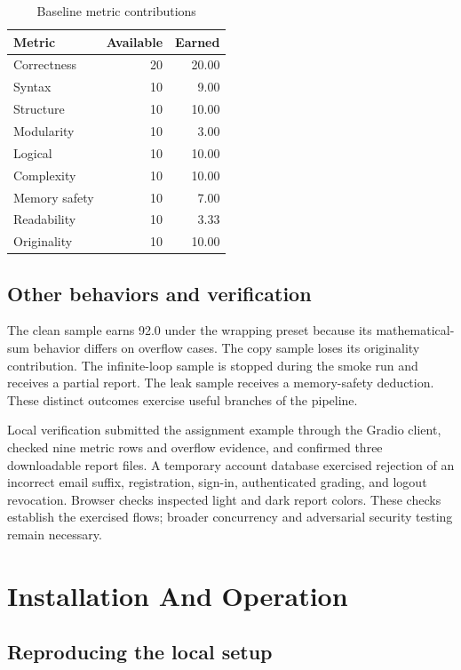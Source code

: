 \documentclass[conference]{IEEEtran}
\begin{document}
\begin{table}[H]\caption{Baseline metric contributions}\label{tab:2}\centering\begin{tabular}{lrr}\hline
Metric & Available & Earned \\\hline
Correctness & 20 & 20.00 \\
Syntax & 10 & 9.00 \\
Structure & 10 & 10.00 \\
Modularity & 10 & 3.00 \\
Logical & 10 & 10.00 \\
Complexity & 10 & 10.00 \\
Memory safety & 10 & 7.00 \\
Readability & 10 & 3.33 \\
Originality & 10 & 10.00 \\\hline\end{tabular}\end{table}

\subsection{Other behaviors and verification}

The clean sample earns 92.0 under the wrapping preset because its mathematical-sum behavior differs on overflow cases. The copy sample loses its originality contribution. The infinite-loop sample is stopped during the smoke run and receives a partial report. The leak sample receives a memory-safety deduction. These distinct outcomes exercise useful branches of the pipeline.


Local verification submitted the assignment example through the Gradio client, checked nine metric rows and overflow evidence, and confirmed three downloadable report files. A temporary account database exercised rejection of an incorrect email suffix, registration, sign-in, authenticated grading, and logout revocation. Browser checks inspected light and dark report colors. These checks establish the exercised flows; broader concurrency and adversarial security testing remain necessary.


\newpage

\section{Installation And Operation}

\subsection{Reproducing the local setup}
\end{document}
